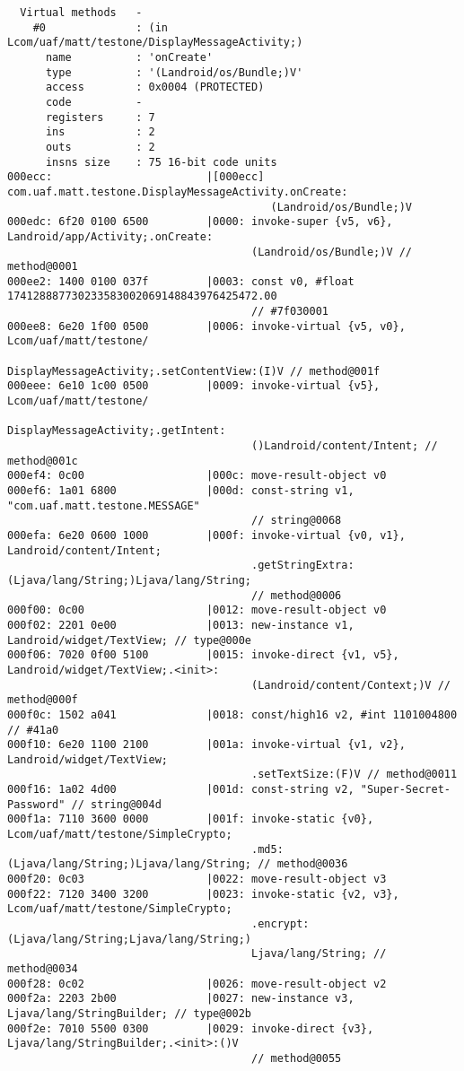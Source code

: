 \begin{lstlisting}
  Virtual methods   -
    #0              : (in Lcom/uaf/matt/testone/DisplayMessageActivity;)
      name          : 'onCreate'
      type          : '(Landroid/os/Bundle;)V'
      access        : 0x0004 (PROTECTED)
      code          -
      registers     : 7
      ins           : 2
      outs          : 2
      insns size    : 75 16-bit code units
000ecc:                        |[000ecc] com.uaf.matt.testone.DisplayMessageActivity.onCreate:
                                         (Landroid/os/Bundle;)V
000edc: 6f20 0100 6500         |0000: invoke-super {v5, v6}, Landroid/app/Activity;.onCreate:
                                      (Landroid/os/Bundle;)V // method@0001
000ee2: 1400 0100 037f         |0003: const v0, #float 174128887730233583002069148843976425472.00
                                      // #7f030001
000ee8: 6e20 1f00 0500         |0006: invoke-virtual {v5, v0}, Lcom/uaf/matt/testone/
                                      DisplayMessageActivity;.setContentView:(I)V // method@001f
000eee: 6e10 1c00 0500         |0009: invoke-virtual {v5}, Lcom/uaf/matt/testone/
                                      DisplayMessageActivity;.getIntent:
                                      ()Landroid/content/Intent; // method@001c
000ef4: 0c00                   |000c: move-result-object v0
000ef6: 1a01 6800              |000d: const-string v1, "com.uaf.matt.testone.MESSAGE"
                                      // string@0068
000efa: 6e20 0600 1000         |000f: invoke-virtual {v0, v1}, Landroid/content/Intent;
                                      .getStringExtra:(Ljava/lang/String;)Ljava/lang/String;
                                      // method@0006
000f00: 0c00                   |0012: move-result-object v0
000f02: 2201 0e00              |0013: new-instance v1, Landroid/widget/TextView; // type@000e
000f06: 7020 0f00 5100         |0015: invoke-direct {v1, v5}, Landroid/widget/TextView;.<init>:
                                      (Landroid/content/Context;)V // method@000f
000f0c: 1502 a041              |0018: const/high16 v2, #int 1101004800 // #41a0
000f10: 6e20 1100 2100         |001a: invoke-virtual {v1, v2}, Landroid/widget/TextView;
                                      .setTextSize:(F)V // method@0011
000f16: 1a02 4d00              |001d: const-string v2, "Super-Secret-Password" // string@004d
000f1a: 7110 3600 0000         |001f: invoke-static {v0}, Lcom/uaf/matt/testone/SimpleCrypto;
                                      .md5:(Ljava/lang/String;)Ljava/lang/String; // method@0036
000f20: 0c03                   |0022: move-result-object v3
000f22: 7120 3400 3200         |0023: invoke-static {v2, v3}, Lcom/uaf/matt/testone/SimpleCrypto;
                                      .encrypt:(Ljava/lang/String;Ljava/lang/String;)
                                      Ljava/lang/String; // method@0034
000f28: 0c02                   |0026: move-result-object v2
000f2a: 2203 2b00              |0027: new-instance v3, Ljava/lang/StringBuilder; // type@002b
000f2e: 7010 5500 0300         |0029: invoke-direct {v3}, Ljava/lang/StringBuilder;.<init>:()V
                                      // method@0055






\end{lstlisting}
